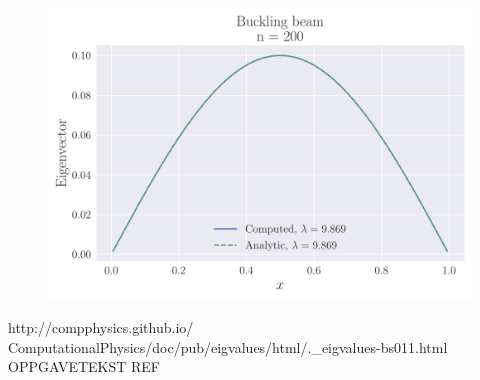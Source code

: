 \documentclass[reprint,english,notitlepage,nofootinbib]{revtex4-1}  %
\begin{document}
\begin{figure}[h]
	\centering
	\includegraphics[width=\linewidth]{../output/BB_200_0.pdf}
	\label{fig:BB200}
	\caption{}
\end{figure}

\onecolumngrid
\begin{thebibliography}{}
 http://compphysics.github.io/
ComputationalPhysics/doc/pub/eigvalues/html/.\_eigvalues-bs011.html
 OPPGAVETEKST REF

\end{thebibliography}
\end{document}

